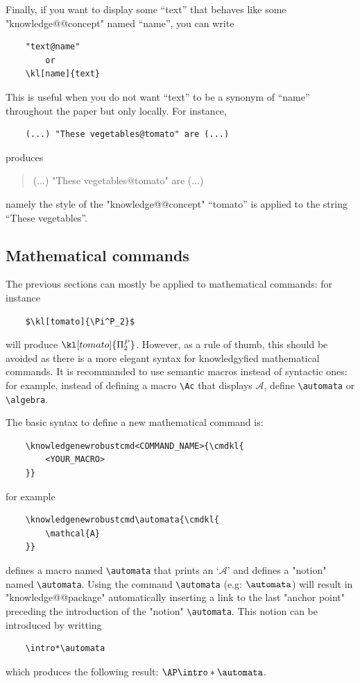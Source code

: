 \documentclass{article}
\begin{document}
Finally, if you want to display some ``text'' that behaves
like some "knowledge@@concept" named ``name'', you can write
%
\begin{verbatim}
    "text@name"
        or
    \kl[name]{text}
\end{verbatim}
%
This is useful when you do not want ``text'' to be a synonym
of ``name'' throughout the paper but only locally.
For instance,
%
\begin{verbatim}
    (...) "These vegetables@tomato" are (...)
\end{verbatim}
%
produces 
\begin{quote}
    (...) "These vegetables@tomato" are (...)
\end{quote}
namely the style of the "knowledge@@concept" ``tomato'' is applied to the
string ``These vegetables''.


\subsection{Mathematical commands}


The previous sections can mostly be applied to mathematical commands:
for instance 
\begin{verbatim}
    $\kl[tomato]{\Pi^P_2}$
\end{verbatim}
will produce $\kl[tomato]{\Pi^P_2}$. However, as a rule of thumb,
this should be avoided as there is a more elegant syntax for 
knowledgyfied mathematical commands. It is recommanded to
use semantic macros instead of syntactic ones: for example,
instead of defining a macro \verb|\Ac| that displays $\mathcal{A}$, 
define \verb|\automata| or \verb|\algebra|.

The basic syntax to define a new mathematical command is:
\begin{verbatim}
    \knowledgenewrobustcmd<COMMAND_NAME>{\cmdkl{
        <YOUR_MACRO>
    }}
\end{verbatim}
for example
\begin{verbatim}
    \knowledgenewrobustcmd\automata{\cmdkl{
        \mathcal{A}
    }}
\end{verbatim}
defines a macro named \verb|\automata| that prints an `$\mathcal{A}$' and 
defines a "notion" named \verb|\automata|.
Using the command \verb|\automata| (e.g: $\automata$) will result in
"knowledge@@package" automatically inserting a link to the last "anchor point"
preceding the introduction of the "notion" \verb|\automata|.
This notion can be introduced by writting
\begin{verbatim}
    \intro*\automata
\end{verbatim}
which produces the following result: $\AP\intro*\automata$.
\end{document}

